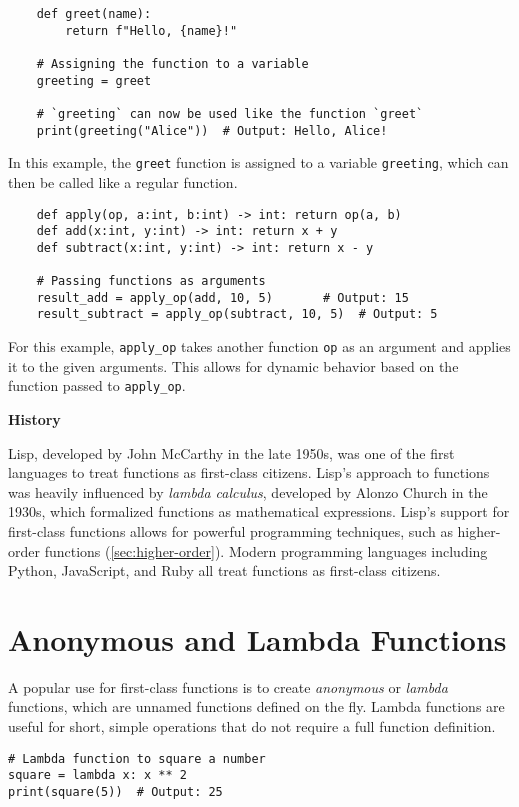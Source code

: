 \documentclass[oneside,11pt,dvipsnames]{book}
\newenvironment{historybox}[1][]{
  \small
  \begin{myhistorybox}
    {\small \textbf{#1}}
  }{
  \end{myhistorybox}
}
\newcommand{\code}[1]{\texttt{#1}}
\begin{document}
\begin{lstlisting}
    def greet(name):
        return f"Hello, {name}!"

    # Assigning the function to a variable
    greeting = greet

    # `greeting` can now be used like the function `greet`
    print(greeting("Alice"))  # Output: Hello, Alice!
\end{lstlisting}

In this example, the \code{greet} function is assigned to a variable \code{greeting}, which can then be called like a regular function. 

\begin{lstlisting}
    def apply(op, a:int, b:int) -> int: return op(a, b)        
    def add(x:int, y:int) -> int: return x + y        
    def subtract(x:int, y:int) -> int: return x - y        

    # Passing functions as arguments
    result_add = apply_op(add, 10, 5)       # Output: 15
    result_subtract = apply_op(subtract, 10, 5)  # Output: 5
\end{lstlisting}

For this example, \code{apply\_op} takes another function \code{op} as an argument and applies it to the given arguments. This allows for dynamic behavior based on the function passed to \code{apply\_op}.

\begin{historybox}[History]
Lisp, developed by John McCarthy in the late 1950s, was one of the first languages to treat functions as first-class citizens. Lisp's approach to functions was heavily influenced by \emph{lambda calculus}, developed by Alonzo Church in the 1930s, which formalized functions as mathematical expressions. Lisp's support for first-class functions allows for powerful programming techniques, such as higher-order functions (\autoref{sec:higher-order}).  Modern programming languages including Python, JavaScript, and Ruby all treat functions as first-class citizens. 
\end{historybox}

\section{Anonymous and Lambda Functions}\label{sec:lambda}
A popular use for first-class functions is to create \emph{anonymous} or \emph{lambda} functions, which are unnamed functions defined on the fly. Lambda functions are useful for short, simple operations that do not require a full function definition. 
\begin{lstlisting}
# Lambda function to square a number
square = lambda x: x ** 2
print(square(5))  # Output: 25
\end{lstlisting}
\end{document}
